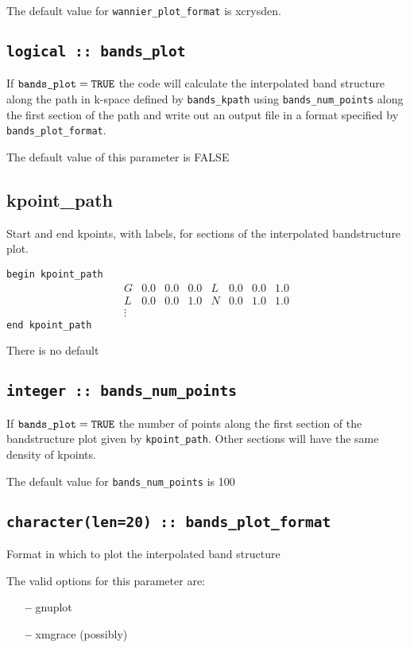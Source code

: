 The default value for \verb#wannier_plot_format# is xcrysden.



\subsection[bands\_plot]{\tt logical :: bands\_plot}

If $\verb#bands_plot#=\verb#TRUE#$ the code will calculate the interpolated band structure along
the path in k-space defined by \verb#bands_kpath# using \verb#bands_num_points# along the first
section of the path and write out an output file in a format specified
by \verb#bands_plot_format#. 

The default value of this parameter is FALSE


\subsection[kpoint\_path]{kpoint\_path}
Start and end kpoints, with labels, for sections of the interpolated
bandstructure plot.

\noindent  \verb#begin kpoint_path#
$$
\begin{array}{cccccccc}
G & 0.0 & 0.0 & 0.0 & L & 0.0 & 0.0 & 1.0 \\
L & 0.0 & 0.0 & 1.0 & N & 0.0 & 1.0 & 1.0 \\
\vdots
\end{array}
$$
\verb#end kpoint_path#

There is no default

\subsection[bands\_num\_points]{\tt integer :: bands\_num\_points}

If $\verb#bands_plot#=\verb#TRUE#$ the number of points along the first
section of the bandstructure plot given by \verb#kpoint_path#. Other
sections will have the same density of kpoints.

The default value for \verb#bands_num_points# is 100


\subsection[bands\_plot\_format]{\tt character(len=20) :: bands\_plot\_format}

Format in which to plot the interpolated band structure

The valid options for this parameter are:
\begin{itemize}
\item[{\bf --}] gnuplot
\item[{\bf --}] xmgrace (possibly)
\end{itemize}

